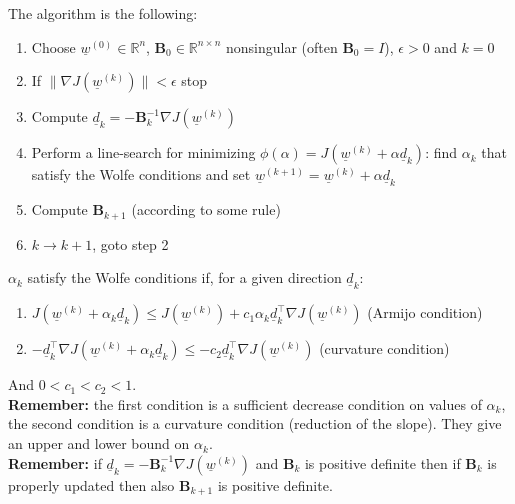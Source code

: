 The algorithm is the following:
\begin{enumerate}
    \item Choose $\underline{w}^{(0)} \in \mathbb{R}^n$, $\mathbf{B}_0 \in \mathbb{R}^{n \times n}$ nonsingular (often $\mathbf{B}_0 = I$), $\epsilon > 0$ and $k = 0$
    \item If $\|\nabla J(\underline{w}^{(k)})\| < \epsilon$ stop
    \item Compute $\underline{d}_k = - \mathbf{B}_k^{-1}\nabla J(\underline{w}^{(k)})$
    \item Perform a line-search for minimizing $\phi(\alpha) = J(\underline{w}^{(k)} + \alpha\underline{d}_k)$: find $\alpha_k$ that satisfy the Wolfe conditions and set $\underline{w}^{(k+1)} = \underline{w}^{(k)} + \alpha \underline{d}_k$ 
    \item Compute $\mathbf{B}_{k+1}$ (according to some rule)
    \item $k \to k+1$, goto step 2
\end{enumerate}
$\alpha_k$ satisfy the Wolfe conditions if, for a given direction $\underline{d}_k$:
\begin{enumerate}
    \item $J(\underline{w}^{(k)} + \alpha_k\underline{d}_k) \leq J(\underline{w}^{(k)}) + c_1 \alpha_k \underline{d}_k^\intercal \nabla J(\underline{w}^{(k)}) $ (Armijo condition)
    \item $- \underline{d}_k^\intercal \nabla J(\underline{w}^{(k)} + \alpha_k\underline{d}_k) \leq -c_2 \underline{d}_k^\intercal \nabla J(\underline{w}^{(k)})$ (curvature condition)
\end{enumerate}
And $0 < c_1 < c_2 < 1$.\\

\textbf{Remember: } the first condition is a sufficient decrease condition on values of $\alpha_k$, the second condition is a curvature condition (reduction of the slope). They give an upper and lower bound on $\alpha_k$.\\

\textbf{Remember: } if $\underline{d}_k = - \mathbf{B}_k^{-1}\nabla J(\underline{w}^{(k)})$ and $\textbf{B}_k$ is positive definite then if $\textbf{B}_k$ is properly updated then also $\textbf{B}_{k+1}$ is positive definite. \\


